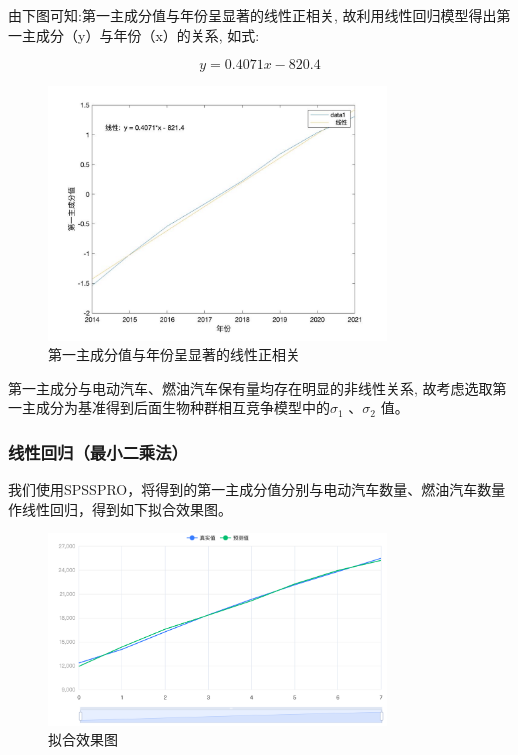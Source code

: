 \documentclass[12pt, a4paper, oneside]{ctexart}
\begin{document}
由下图可知:第一主成分值与年份呈显著的线性正相关,
故利用线性回归模型得出第一主成分（y）与年份（x）的关系, 如式:

\begin{dmath}
  y=0.4071x-820.4
\end{dmath}

\begin{figure}[H]
  \centering
  \includegraphics[width=0.8\textwidth]{pic/第一主成分值（1）.jpg}
  \caption{第一主成分值与年份呈显著的线性正相关}
  \label{fig:第一主成分值与年份}
\end{figure}

第一主成分与电动汽车、燃油汽车保有量均存在明显的非线性关系,
故考虑选取第一主成分为基准得到后面生物种群相互竞争模型中的$\sigma_1$
  、$\sigma_2$ 值。

\subsubsection{{线性回归（最小二乘法）}}

我们使用SPSSPRO，将得到的第一主成分值分别与电动汽车数量、燃油汽车数量作线性回归，得到如下拟合效果图。

\begin{figure}[H]
  \centering
  \includegraphics[width=0.8\textwidth]{pic/拟合效果图 (1).png}
  \caption{拟合效果图}
  \label{fig:拟合效果图}
\end{figure}
\end{document}
